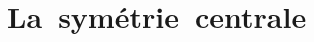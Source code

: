 \chapter{\mbox{La symétrie centrale}} %



\activites


\cours


\exercicesbase


% 

\Recreation


% 

% 

% 

%
% 
